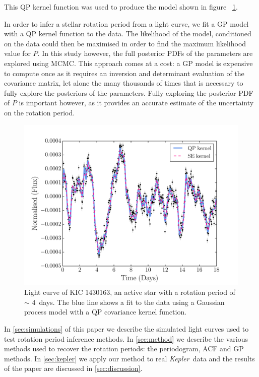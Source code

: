 \documentclass[useAMS, usenatbib, preprint, 12pt]{aastex}
\newcommand{\kepexample}{1430163}
\newcommand{\kepexampleperiod}{4}
\newcommand{\Kepler}{{\it Kepler}}
\newcommand{\kepler}{\Kepler}
\begin{document}
This QP kernel function was used to produce the model shown in figure
~\ref{fig:GP_example}.

In order to infer a stellar rotation period from a light curve, we fit a GP
model with a QP kernel function to the data.
The likelihood of the model, conditioned on the data could then be maximised
in order to find the maximum likelihood value for $P$.
In this study however, the full posterior PDFs of the parameters are explored
using MCMC.
This approach comes at a cost: a GP model is expensive to compute once as it
requires an inversion and determinant evaluation of the covariance matrix, let
alone the many thousands of times that is necessary to fully explore the
posteriors of the parameters.
Fully exploring the posterior PDF of $P$ is important however, as it provides
an accurate estimate of the uncertainty on the rotation period.

\begin{figure}
\begin{center}
\includegraphics[width=6in, clip=true]{figures/001430163.pdf}
\caption[A light curve with a GP model.]
{Light curve of KIC \kepexample, an active star with a rotation period of
$\sim$ \kepexampleperiod\ days.
The blue line shows a fit to the data using a Gaussian process model with a QP
covariance kernel function.}
\label{fig:GP_example}
\end{center}
\end{figure}

In \textsection \ref{sec:simulations} of this paper we describe the simulated
light curves used to test rotation period inference methods.
In \textsection \ref{sec:method} we describe the various methods used to
recover the rotation periods: the periodogram, ACF and GP methods.
In \textsection \ref{sec:kepler} we apply our method to real \kepler\ data and
the results of the paper are discussed in \textsection \ref{sec:discussion}.
\end{document}
